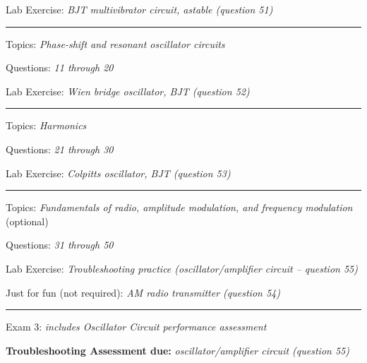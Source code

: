 \hskip 10pt Lab Exercise: {\it BJT multivibrator circuit, astable (question 51)}
 
\vskip 10pt
\hrule \vskip 5pt
\noindent
{}

\hskip 10pt Topics: {\it Phase-shift and resonant oscillator circuits}
 
\hskip 10pt Questions: {\it 11 through 20}
 
\hskip 10pt Lab Exercise: {\it Wien bridge oscillator, BJT (question 52)}
 
 
\vskip 10pt
\hrule \vskip 5pt
\noindent
{}

\hskip 10pt Topics: {\it Harmonics}
 
\hskip 10pt Questions: {\it 21 through 30}
 
\hskip 10pt Lab Exercise: {\it Colpitts oscillator, BJT (question 53)}
 




\vskip 10pt
\hrule \vskip 5pt
\noindent
{}

\hskip 10pt Topics: {\it Fundamentals of radio, amplitude modulation, and frequency modulation} (optional)
 
\hskip 10pt Questions: {\it 31 through 50}
 
\hskip 10pt Lab Exercise: {\it Troubleshooting practice (oscillator/amplifier circuit -- question 55)}

\hskip 10pt Just for fun (not required): {\it AM radio transmitter (question 54)}
 

\vskip 10pt
\hrule \vskip 5pt
\noindent
{}

\hskip 10pt Exam 3: {\it includes Oscillator Circuit performance assessment}
 
\hskip 10pt {\bf Troubleshooting Assessment due:} {\it oscillator/amplifier circuit (question 55)}
 
